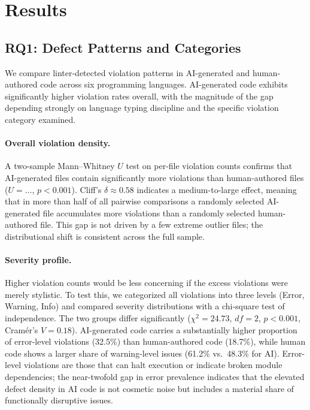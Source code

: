 \section{Results}
\label{sec:results}

\subsection{RQ1: Defect Patterns and Categories}
\label{sec:results-rq1}

We compare linter-detected violation patterns in AI-generated and human-authored code across six programming languages. AI-generated code exhibits significantly higher violation rates overall, with the magnitude of the gap depending strongly on language typing discipline and the specific violation category examined.

\paragraph{Overall violation density.}
A two-sample Mann--Whitney $U$ test on per-file violation counts confirms that AI-generated files contain significantly more violations than human-authored files ($U= \dots$, $p<0.001$). Cliff's $\delta \approx 0.58$ indicates a medium-to-large effect, meaning that in more than half of all pairwise comparisons a randomly selected AI-generated file accumulates more violations than a randomly selected human-authored file. This gap is not driven by a few extreme outlier files; the distributional shift is consistent across the full sample.

\paragraph{Severity profile.}
Higher violation counts would be less concerning if the excess violations were merely stylistic. To test this, we categorized all violations into three levels (Error, Warning, Info) and compared severity distributions with a chi-square test of independence. The two groups differ significantly ($\chi^2 = 24.73$, $df = 2$, $p < 0.001$, Cramér's $V = 0.18$). AI-generated code carries a substantially higher proportion of error-level violations (32.5\%) than human-authored code (18.7\%), while human code shows a larger share of warning-level issues (61.2\% vs.\ 48.3\% for AI). Error-level violations are those that can halt execution or indicate broken module dependencies; the near-twofold gap in error prevalence indicates that the elevated defect density in AI code is not cosmetic noise but includes a material share of functionally disruptive issues.


